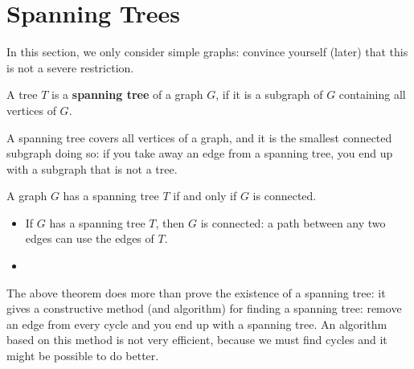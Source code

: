 \section{Spanning Trees}

In this section, we only consider simple graphs: convince yourself
(later) that this is not a severe restriction.

 \begin{definition}
A tree \textup{$T$ is a \textbf{spanning tree} of a graph $G$,
if it is a subgraph of $G$ containing all vertices of $G$.}
\end{definition}

A spanning tree covers all vertices of a graph, and it is the smallest
connected subgraph doing so: if you take away an edge from a spanning
tree, you end up with a subgraph that is not a tree.

 \begin{theorem}
A graph $G$ has a spanning tree $T$ if and only if $G$ is connected.
\end{theorem}
\begin{proof*}
\begin{itemize}
\item[\fbox{$\Rightarrow$}]
If $G$ has a spanning tree $T$, then $G$ is connected: a path between
any two edges can use the edges of $T$.

\item[\fbox{$\Leftarrow$}]
\end{itemize}
\end{proof*}

The above theorem does more than prove the existence of a spanning
tree: it gives a constructive method (and algorithm) for finding a
spanning tree: remove an edge from every cycle and you end up with a
spanning tree. An algorithm based on this method is not very
efficient, because we must find cycles and it might be possible to do
better.

